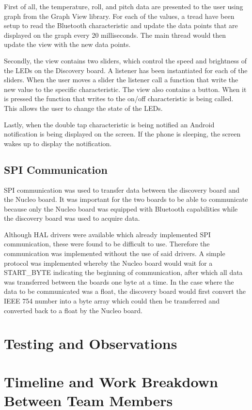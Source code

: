 \documentclass[12pt]{article}
\begin{document}
First of all, the temperature, roll, and pitch data are presented to the user using graph from the Graph View library. For each of the values, a tread have been setup to read the Bluetooth characteristic and update the data points that are displayed on the graph every 20 milliseconds. The main thread would then update the view with the new data points.

Secondly, the view contains two sliders, which control the speed and brightness of the LEDs on the Discovery board. A listener has been instantiated for each of the sliders. When the user moves a slider the listener call a function that write the new value to the specific characteristic. The view also contains a button. When it is pressed the function that writes to the on/off characteristic is being called. This allows the user to change the state of the LEDs.

Lastly, when the double tap characteristic is being notified an Android notification is being displayed on the screen. If the phone is sleeping, the screen wakes up to display the notification.

\subsection{SPI Communication}
SPI communication was used to transfer data between the discovery board and the Nucleo board. It was important for the two boards to be able to communicate because only the Nucleo board was equipped with Bluetooth capabilities while the discovery board was used to acquire data.

Although HAL drivers were available which already implemented SPI communication, these were found to be difficult to use. Therefore the communication was implemented without the use of said drivers. A simple protocol was implemented whereby the Nucleo board would wait for a START\_BYTE indicating the beginning of communication, after which all data was transferred between the boards one byte at a time. In the case where the data to be communicated was a float, the discovery board would first convert the IEEE 754 number into a byte array which could then be transferred and converted back to a float by the Nucleo board.

\section{Testing and Observations}

\section{Timeline and Work Breakdown Between Team Members}
\end{document}
